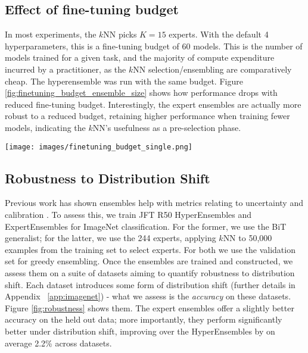 \documentclass{article} \usepackage{iclr2021_conference,times}
\begin{document}
\subsection{Effect of fine-tuning budget}
\noindent
\begin{minipage}{.588\textwidth}
In most experiments, the $k$NN picks $K = 15$ experts. With the default 4 hyperparameters, this is a fine-tuning budget of 60 models. This is the number of models trained for a given task, and the majority of compute expenditure incurred by a practitioner, as the $k$NN selection/ensembling are comparatively cheap. The hyperensemble was run with the same budget. Figure \ref{fig:finetuning_budget_ensemble_size} shows how performance drops with reduced fine-tuning budget. Interestingly, the expert ensembles are actually more robust to a reduced budget, retaining higher performance when training fewer models, indicating the $k$NN's usefulness as a pre-selection phase.
\end{minipage}\hfill
\begin{minipage}{.39\textwidth}
\centering
\texttt{[image: images/finetuning\_budget\_single.png]}\hspace{-1ex}
\label{fig:finetuning_budget_ensemble_size}
\end{minipage}

\subsection{Robustness to Distribution Shift}
Previous work has shown ensembles help with metrics relating to uncertainty and calibration \citep{balaji2017ensembles,stickl2020diverse}. To assess this, we train JFT R50 HyperEnsembles and ExpertEnsembles for ImageNet classification. For the former, we use the BiT generalist; for the latter, we use the 244 experts, applying $k$NN to 50,000 examples from the training set to select experts. For both we use the validation set for greedy ensembling.
Once the ensembles are trained and constructed, we assess them on a suite of datasets aiming to quantify robustness to distribution shift.
Each dataset introduces some form of distribution shift (further details in Appendix ~\ref{app:imagenet}) - what we assess is the \textit{accuracy} on these datasets.
Figure \ref{fig:robustness} shows them. The expert ensembles offer a slightly better accuracy on the held out data; more importantly, they perform significantly better under distribution shift, improving over the HyperEnsembles by on average 2.2\% across datasets.
\end{document}
